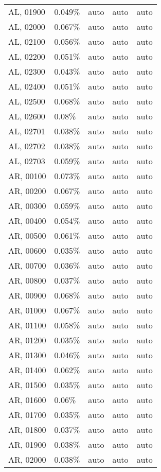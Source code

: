 \begin{longtable}[]{@{}lllll@{}}
AL, 01900 & 0.049\% & auto & auto & auto \\
AL, 02000 & 0.067\% & auto & auto & auto \\
AL, 02100 & 0.056\% & auto & auto & auto \\
AL, 02200 & 0.051\% & auto & auto & auto \\
AL, 02300 & 0.043\% & auto & auto & auto \\
AL, 02400 & 0.051\% & auto & auto & auto \\
AL, 02500 & 0.068\% & auto & auto & auto \\
AL, 02600 & 0.08\% & auto & auto & auto \\
AL, 02701 & 0.038\% & auto & auto & auto \\
AL, 02702 & 0.038\% & auto & auto & auto \\
AL, 02703 & 0.059\% & auto & auto & auto \\
AR, 00100 & 0.073\% & auto & auto & auto \\
AR, 00200 & 0.067\% & auto & auto & auto \\
AR, 00300 & 0.059\% & auto & auto & auto \\
AR, 00400 & 0.054\% & auto & auto & auto \\
AR, 00500 & 0.061\% & auto & auto & auto \\
AR, 00600 & 0.035\% & auto & auto & auto \\
AR, 00700 & 0.036\% & auto & auto & auto \\
AR, 00800 & 0.037\% & auto & auto & auto \\
AR, 00900 & 0.068\% & auto & auto & auto \\
AR, 01000 & 0.067\% & auto & auto & auto \\
AR, 01100 & 0.058\% & auto & auto & auto \\
AR, 01200 & 0.035\% & auto & auto & auto \\
AR, 01300 & 0.046\% & auto & auto & auto \\
AR, 01400 & 0.062\% & auto & auto & auto \\
AR, 01500 & 0.035\% & auto & auto & auto \\
AR, 01600 & 0.06\% & auto & auto & auto \\
AR, 01700 & 0.035\% & auto & auto & auto \\
AR, 01800 & 0.037\% & auto & auto & auto \\
AR, 01900 & 0.038\% & auto & auto & auto \\
AR, 02000 & 0.038\% & auto & auto & auto \\

\end{longtable}
